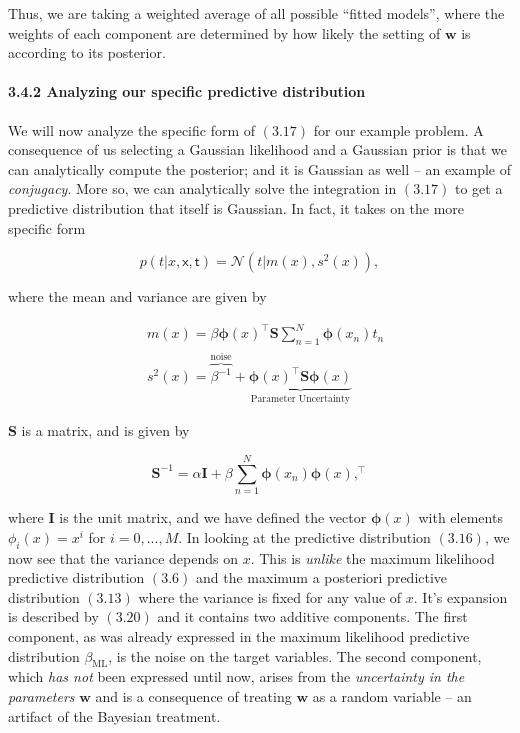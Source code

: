 \documentclass[
  0.875em,
  letterpaper,
  DIV=11,
  numbers=noendperiod]{scrartcl}
\let\oldparagraph\paragraph
\renewcommand{\paragraph}[1]{\oldparagraph{#1}\mbox{}}
\begin{document}
Thus, we are taking a weighted average of all possible ``fitted
models'', where the weights of each component are determined by how
likely the setting of \(\mathbf{w}\) is according to its posterior.

\hypertarget{analyzing-our-specific-predictive-distribution}{%
\paragraph{\texorpdfstring{\textbf{3.4.2 Analyzing our specific
predictive
distribution}}{3.4.2 Analyzing our specific predictive distribution}}\label{analyzing-our-specific-predictive-distribution}}

We will now analyze the specific form of \((3.17)\) for our example
problem. A consequence of us selecting a Gaussian likelihood and a
Gaussian prior is that we can analytically compute the posterior; and it
is Gaussian as well -- an example of \emph{conjugacy}. More so, we can
analytically solve the integration in \((3.17)\) to get a predictive
distribution that itself is Gaussian. In fact, it takes on the more
specific form

\[
p(t|x, \pmb{\mathsf{x}}, \pmb{\mathsf{t}}) = \mathcal{N}(t|m(x), s^2(x)), \tag{3.18}
\]

where the mean and variance are given by

\begin{align}
&m(x) = \beta \pmb{\phi}(x)^{\intercal} \mathbf{S} \sum_{n=1}^N \pmb{\phi}(x_n) t_n \tag{3.19} \\
& s^2(x) = \overbrace{\beta^{-1}}^{\text{noise}} + \underbrace{\pmb{\phi}(x)^\intercal \mathbf{S} \pmb{\phi}(x)}_{\text{Parameter Uncertainty}} \tag{3.20}
\end{align}

\(\mathbf{S}\) is a matrix, and is given by

\[
\mathbf{S}^{-1} = \alpha \mathbf{I} + \beta \sum_{n=1}^N \pmb{\phi}(x_n)  \pmb{\phi}(x),^\intercal \tag{3.21}
\]

where \(\mathbf{I}\) is the unit matrix, and we have defined the vector
\(\pmb{\phi}(x)\) with elements \(\phi_i(x) = x^i\) for \(i=0,...,M\).
In looking at the predictive distribution \((3.16)\), we now see that
the variance depends on \(x\). This is \emph{unlike} the maximum
likelihood predictive distribution \((3.6)\) and the maximum a
posteriori predictive distribution \((3.13)\) where the variance is
fixed for any value of \(x\). It's expansion is described by \((3.20)\)
and it contains two additive components. The first component, as was
already expressed in the maximum likelihood predictive distribution
\(\beta_{\text{ML}}\), is the noise on the target variables. The second
component, which \emph{has not} been expressed until now, arises from
the \emph{uncertainty in the parameters} \(\mathbf{w}\) and is a
consequence of treating \(\mathbf{w}\) as a random variable -- an
artifact of the Bayesian treatment.
\end{document}

